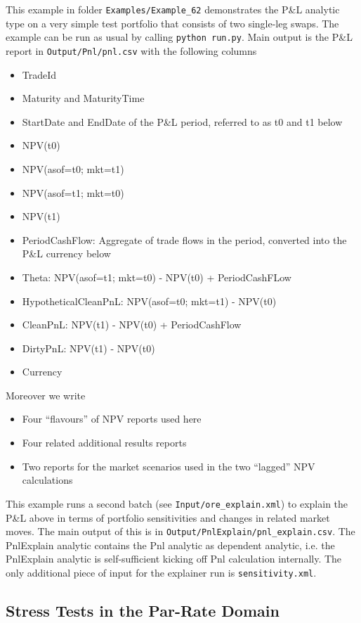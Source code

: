 This example in folder {\tt Examples/Example\_62} demonstrates the P\&L analytic
type on a very simple test portfolio that consists of two
single-leg swaps. The example can be run as usual by calling {\tt python run.py}.
Main output is the P\&L report in {\tt Output/Pnl/pnl.csv} with the following columns
\begin{itemize}
\item TradeId
\item Maturity and MaturityTime
\item StartDate and EndDate of the P\&L period, referred to as t0 and t1 below
\item NPV(t0)
\item NPV(asof=t0; mkt=t1)
\item NPV(asof=t1; mkt=t0)
\item NPV(t1)
\item PeriodCashFlow: Aggregate of trade flows in the period, converted into the P\&L currency below
\item Theta: NPV(asof=t1; mkt=t0) - NPV(t0) + PeriodCashFLow
\item HypotheticalCleanPnL: NPV(asof=t0; mkt=t1) - NPV(t0)
\item CleanPnL: NPV(t1) - NPV(t0) + PeriodCashFlow
\item DirtyPnL: NPV(t1) - NPV(t0)
\item Currency
\end{itemize}
Moreover we write
\begin{itemize}
\item Four ``flavours'' of NPV reports used here
\item Four related additional results reports
\item Two reports for the market scenarios used in the two ``lagged'' NPV calculations
\end{itemize}

This example runs a second batch (see {\tt Input/ore\_explain.xml}) to explain the
P\&L above in terms of portfolio sensitivities and changes in related market moves. The main output of this
is in {\tt Output/PnlExplain/pnl\_explain.csv}. The PnlExplain analytic contains the Pnl analytic as dependent
analytic, i.e. the PnlExplain analytic is self-sufficient kicking off Pnl calculation internally.
The only additional piece of input for the explainer run is {\tt sensitivity.xml}.

\subsection{Stress Tests in the Par-Rate Domain}%
\label{example:63}


